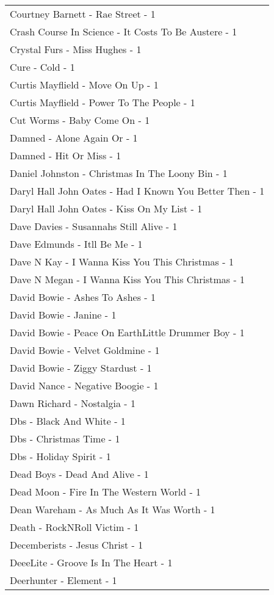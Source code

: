 \documentclass[
]{article}
\begin{document}
\begin{longtable}{l}
Courtney Barnett - Rae Street - 1 \\ 
Crash Course In Science - It Costs To Be Austere - 1 \\ 
Crystal Furs - Miss Hughes - 1 \\ 
Cure - Cold - 1 \\ 
Curtis Mayflield - Move On Up - 1 \\ 
Curtis Mayflield - Power To The People - 1 \\ 
Cut Worms - Baby Come On - 1 \\ 
Damned - Alone Again Or - 1 \\ 
Damned - Hit Or Miss - 1 \\ 
Daniel Johnston - Christmas In The Loony Bin - 1 \\ 
Daryl Hall John Oates - Had I Known You Better Then - 1 \\ 
Daryl Hall John Oates - Kiss On My List - 1 \\ 
Dave Davies - Susannahs Still Alive - 1 \\ 
Dave Edmunds - Itll Be Me - 1 \\ 
Dave N Kay - I Wanna Kiss You This Christmas - 1 \\ 
Dave N Megan - I Wanna Kiss You This Christmas - 1 \\ 
David Bowie - Ashes To Ashes - 1 \\ 
David Bowie - Janine - 1 \\ 
David Bowie - Peace On EarthLittle Drummer Boy - 1 \\ 
David Bowie - Velvet Goldmine - 1 \\ 
David Bowie - Ziggy Stardust - 1 \\ 
David Nance - Negative Boogie - 1 \\ 
Dawn Richard - Nostalgia - 1 \\ 
Dbs - Black And White - 1 \\ 
Dbs - Christmas Time - 1 \\ 
Dbs - Holiday Spirit - 1 \\ 
Dead Boys - Dead And Alive - 1 \\ 
Dead Moon - Fire In The Western World - 1 \\ 
Dean Wareham - As Much As It Was Worth - 1 \\ 
Death - RockNRoll Victim - 1 \\ 
Decemberists - Jesus Christ - 1 \\ 
DeeeLite - Groove Is In The Heart - 1 \\ 
Deerhunter - Element - 1 \\ 

\end{longtable}
\end{document}
